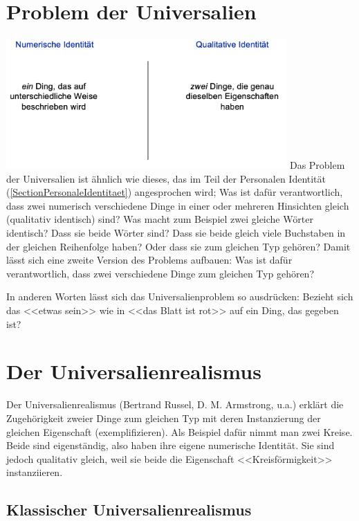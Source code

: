 \documentclass[../main.tex]{subfiles}
\begin{document}
\section{Problem der Universalien}
{\centering\includegraphics[height=5cm]{images/numerische_und_qualitative_identitaet.png}\endcenter}
Das Problem der Universalien ist ähnlich wie dieses, das im Teil der Personalen Identität (\ref{SectionPersonaleIdentitaet}) angesprochen wird; Was ist dafür verantwortlich, dass zwei numerisch verschiedene Dinge in einer oder mehreren Hinsichten gleich (qualitativ identisch) sind? Was macht zum Beispiel zwei gleiche Wörter identisch? Dass sie beide Wörter sind? Dass sie beide gleich viele Buchstaben in der gleichen Reihenfolge haben? Oder dass sie zum gleichen Typ gehören? Damit lässt sich eine zweite Version des Problems aufbauen: Was ist dafür verantwortlich, dass zwei verschiedene Dinge zum gleichen Typ gehören?

In anderen Worten lässt sich das Universalienproblem so ausdrücken: Bezieht sich das <<etwas sein>> wie in <<das Blatt ist rot>> auf ein Ding, das gegeben ist?

\section{Der Universalienrealismus}
Der Universalienrealismus (Bertrand Russel, D. M. Armstrong, u.a.) erklärt die Zugehörigkeit zweier Dinge zum gleichen Typ mit deren Instanzierung der gleichen Eigenschaft (exemplifizieren). Als Beispiel dafür nimmt man zwei Kreise. Beide sind eigenständig, also haben ihre eigene numerische Identität. Sie sind jedoch qualitativ gleich, weil sie beide die Eigenschaft <<Kreisförmigkeit>> instanziieren. 

\subsection{Klassischer Universalienrealismus}
\end{document}

